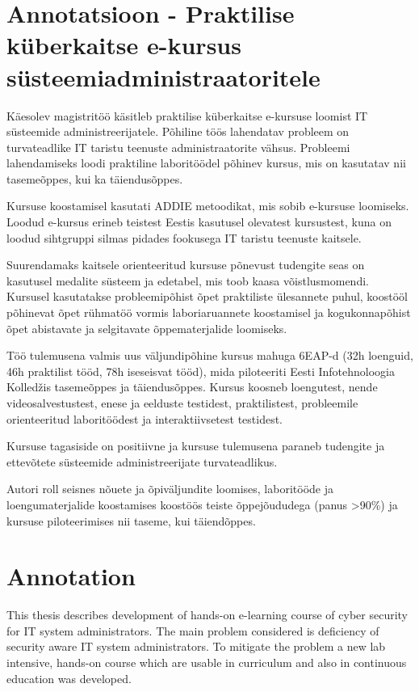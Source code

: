 \clearpage
\chapter*{Annotatsioon - Praktilise küberkaitse e-kursus
süsteemiadministraatoritele}
\label{annotatsioon}
\thispagestyle{empty}

Käesolev magistritöö käsitleb praktilise küberkaitse e-kursuse loomist IT süsteemide administreerijatele. Põhiline töös lahendatav probleem on turvateadlike IT taristu teenuste administraatorite vähsus. Probleemi lahendamiseks loodi praktiline laboritöödel põhinev kursus, mis on kasutatav nii tasemeõppes, kui ka täiendusõppes.

Kursuse koostamisel kasutati \gls{ADDIE} metoodikat, mis sobib e-kursuse loomiseks. Loodud e-kursus erineb teistest Eestis kasutusel olevatest kursustest, kuna on loodud sihtgruppi silmas pidades fookusega IT taristu teenuste kaitsele.

Suurendamaks kaitsele orienteeritud kursuse põnevust tudengite seas on kasutusel medalite süsteem ja edetabel, mis toob kaasa võistlusmomendi. Kursusel kasutatakse probleemipõhist õpet praktiliste ülesannete puhul, koostööl põhinevat õpet rühmatöö vormis laboriaruannete  koostamisel ja kogukonnapõhist õpet abistavate ja selgitavate õppematerjalide loomiseks.

Töö tulemusena valmis uus väljundipõhine kursus mahuga 6EAP-d (32h loenguid, 46h praktilist tööd, 78h iseseisvat tööd), mida piloteeriti Eesti Infotehnoloogia Kolledžis tasemeõppes ja täiendusõppes. Kursus koosneb loengutest, nende videosalvestustest, enese ja eelduste testidest, praktilistest, probleemile orienteeritud laboritöödest ja interaktiivsetest testidest.

Kursuse tagasiside on positiivne ja kursuse tulemusena paraneb tudengite ja ettevõtete süsteemide administreerijate turvateadlikus.

Autori roll seisnes nõuete ja õpiväljundite loomises, laboritööde ja loengumaterjalide koostamises koostöös teiste õppejõududega (panus >90\%) ja kursuse piloteerimises nii taseme, kui täiendõppes.

\clearpage
\chapter*{Annotation}
\label{annotation}
\thispagestyle{empty}

This thesis describes development of hands-on e-learning course of cyber security for IT system administrators. The main problem considered is deficiency of security aware IT system administrators. To mitigate the problem a new lab intensive, hands-on course which are usable in curriculum and also in continuous education was developed.

